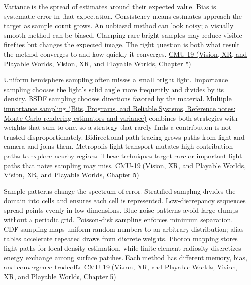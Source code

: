 Variance is the spread of estimates around their expected value. Bias is systematic error in that expectation. Consistency means estimates approach the target as sample count grows. An unbiased method can look noisy; a visually smooth method can be biased. Clamping rare bright samples may reduce visible fireflies but changes the expected image. The right question is both what result the method converges to and how quickly it converges. \href{../07-Vision-XR-and-Playable-Worlds/main.pdf\#nameddest=04-visual-computing-ii-ch036-cmu-19---variance-reduction}{CMU-19 (Vision, XR, and Playable Worlds, Vision, XR, and Playable Worlds, Chapter 5)}

Uniform hemisphere sampling often misses a small bright light. Importance sampling chooses the light's solid angle more frequently and divides by its density. BSDF sampling chooses directions favored by the material. \href{../01-Bits-Programs-and-Reliable-Systems/main.pdf\#nameddest=appendix-031e02bf28af}{Multiple importance sampling (Bits, Programs, and Reliable Systems, Reference notes: Monte Carlo rendering estimators and variance)} combines both strategies with weights that sum to one, so a strategy that rarely finds a contribution is not trusted disproportionately. Bidirectional path tracing grows paths from light and camera and joins them. Metropolis light transport mutates high-contribution paths to explore nearby regions. These techniques target rare or important light paths that naive sampling may miss. \href{../07-Vision-XR-and-Playable-Worlds/main.pdf\#nameddest=04-visual-computing-ii-ch036-cmu-19---variance-reduction}{CMU-19 (Vision, XR, and Playable Worlds, Vision, XR, and Playable Worlds, Chapter 5)}

Sample patterns change the spectrum of error. Stratified sampling divides the domain into cells and ensures each cell is represented. Low-discrepancy sequences spread points evenly in low dimensions. Blue-noise patterns avoid large clumps without a periodic grid. Poisson-disk sampling enforces minimum separation. CDF sampling maps uniform random numbers to an arbitrary distribution; alias tables accelerate repeated draws from discrete weights. Photon mapping stores light paths for local density estimation, while finite-element radiosity discretizes energy exchange among surface patches. Each method has different memory, bias, and convergence tradeoffs. \href{../07-Vision-XR-and-Playable-Worlds/main.pdf\#nameddest=04-visual-computing-ii-ch036-cmu-19---variance-reduction}{CMU-19 (Vision, XR, and Playable Worlds, Vision, XR, and Playable Worlds, Chapter 5)}

